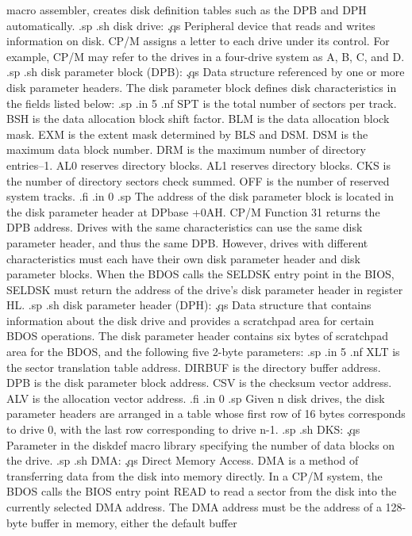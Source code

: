 macro assembler, creates disk definition tables such as the DPB 
and DPH automatically.
.sp
.sh
disk drive:  \c
.qs
Peripheral device that reads and writes information on disk.  
CP/M assigns a letter to each drive under its 
control.  For example, CP/M may refer to the drives in a 
four-drive system as A, B, C, and D.
.sp
.sh
disk parameter block (DPB):  \c
.qs
Data structure referenced by one or more disk parameter headers.  
The disk parameter block defines disk characteristics in the 
fields listed below:
.sp
.in 5
.nf
SPT is the total number of sectors per track.
BSH is the data allocation block shift factor.
BLM is the data allocation block mask.
EXM is the extent mask determined by BLS and DSM.
DSM is the maximum data block number.
DRM is the maximum number of directory entries--1.
AL0 reserves directory blocks.
AL1 reserves directory blocks.
CKS is the number of directory sectors check summed.
OFF is the number of reserved system tracks.
.fi
.in 0
.sp
The address of the disk parameter block is located in the disk 
parameter header at DPbase +0AH.  CP/M Function 31 returns the 
DPB address.  Drives with the same characteristics can use the 
same disk parameter header, and thus the same DPB.  However, 
drives with different characteristics must each have their own 
disk parameter header and disk parameter blocks.  When the BDOS 
calls the SELDSK entry point in the BIOS, SELDSK must return the 
address of the drive's disk parameter header in register HL.
.sp
.sh
disk parameter header (DPH):  \c
.qs
Data structure that contains information about the disk drive and 
provides a scratchpad area for certain BDOS operations.  The disk 
parameter header contains six bytes of scratchpad area for the 
BDOS, and the following five 2-byte parameters:
.sp
.in 5
.nf
XLT is the sector translation table address.
DIRBUF is the directory buffer address.
DPB is the disk parameter block address.
CSV is the checksum vector address.
ALV is the allocation vector address.
.fi
.in 0
.sp
Given n disk drives, the disk parameter headers are arranged in a 
table whose first row of 16 bytes corresponds to drive 0, with 
the last row corresponding to drive n-1.
.sp
.sh
DKS:  \c
.qs
Parameter in the diskdef macro library specifying the number of 
data blocks on the drive.
.sp
.sh
DMA:  \c
.qs
Direct Memory Access.  DMA is a method of transferring data from 
the disk into memory directly.  In a CP/M system, the BDOS calls 
the BIOS entry point READ to read a sector from the disk into the 
currently selected DMA address.  The DMA address must be the 
address of a 128-byte buffer in memory, either the default buffer 
